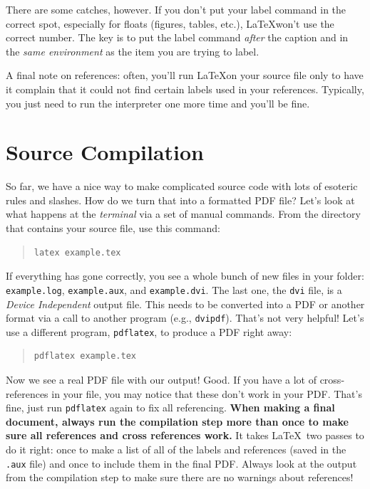 \documentclass[12pt, letterpaper]{article}
\begin{document}
There are some catches, however.  If you don't put your label command in the 
correct spot, especially for floats (figures, tables, etc.), \LaTeX won't use 
the correct number.  The key is to put the label command \emph{after} the 
caption and in the \emph{same environment} as the item you are trying to label.

A final note on references: often, you'll run \LaTeX on your source file only 
to have it complain that it could not find certain labels used in your 
references.  Typically, you just need to run the interpreter one more time and 
you'll be fine.

\section{Source Compilation}
\label{comp}
So far, we have a nice way to make complicated source code with lots of
esoteric rules and slashes.  How do we turn that into a formatted PDF file?
Let's look at what happens at the \emph{terminal} via a set of manual commands.
From the directory that contains your source file, use this command:
\begin{quote}
\begin{verbatim}
latex example.tex
\end{verbatim}
\end{quote}
If everything has gone correctly, you see a whole bunch of new files in your
folder: {\tt example.log}, {\tt example.aux}, and {\tt example.dvi}.  The
last one, the {\tt dvi} file, is a \emph{Device Independent} output file.
This needs to be converted into a PDF or another format via a call to another
program (e.g., {\tt dvipdf}).  That's not very helpful!  Let's use a different
program, {\tt pdflatex}, to produce a PDF right away:
\begin{quote}
\begin{verbatim}
pdflatex example.tex
\end{verbatim}
\end{quote}
Now we see a real PDF file with our output!  Good.  If you have a lot of
cross-references in your file, you may notice that these don't work in
your PDF.  That's fine, just run {\tt pdflatex} again to fix all referencing.
\textbf{When making a final document, always run the compilation step more
  than once to make sure all references and cross references work.}  It takes
\LaTeX \ two passes to do it right: once to make a list of all of the labels
and references (saved in the {\tt .aux} file) and once to include them in the
final PDF.  Always look at the output from the compilation step to make sure
there are no warnings about references!
\end{document}
